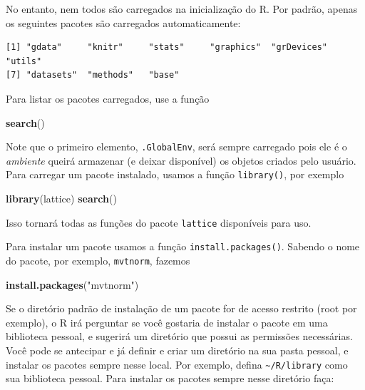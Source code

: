 \documentclass[10pt,a4paper]{book}
\newenvironment{Shaded}{\begin{snugshade}}{\end{snugshade}}
\newcommand{\KeywordTok}[1]{\textcolor[rgb]{0.13,0.29,0.53}{\textbf{#1}}}
\newcommand{\StringTok}[1]{\textcolor[rgb]{0.31,0.60,0.02}{#1}}
\newcommand{\NormalTok}[1]{#1}
\begin{document}
No entanto, nem todos são carregados na inicialização do R. Por padrão,
apenas os seguintes pacotes são carregados automaticamente:

\begin{verbatim}
[1] "gdata"     "knitr"     "stats"     "graphics"  "grDevices" "utils"    
[7] "datasets"  "methods"   "base"     
\end{verbatim}

Para listar os pacotes carregados, use a função

\begin{Shaded}
\begin{Highlighting}[]
\KeywordTok{search}\NormalTok{()}
\end{Highlighting}
\end{Shaded}

Note que o primeiro elemento, \texttt{.GlobalEnv}, será sempre carregado
pois ele é o \emph{ambiente} queirá armazenar (e deixar disponível) os
objetos criados pelo usuário. Para carregar um pacote instalado, usamos
a função \texttt{library()}, por exemplo

\begin{Shaded}
\begin{Highlighting}[]
\KeywordTok{library}\NormalTok{(lattice)}
\KeywordTok{search}\NormalTok{()}
\end{Highlighting}
\end{Shaded}

Isso tornará todas as funções do pacote \texttt{lattice} disponíveis
para uso.

Para instalar um pacote usamos a função \texttt{install.packages()}.
Sabendo o nome do pacote, por exemplo, \texttt{mvtnorm}, fazemos

\begin{Shaded}
\begin{Highlighting}[]
\KeywordTok{install.packages}\NormalTok{(}\StringTok{"mvtnorm"}\NormalTok{)}
\end{Highlighting}
\end{Shaded}

Se o diretório padrão de instalação de um pacote for de acesso restrito
(root por exemplo), o R irá perguntar se você gostaria de instalar o
pacote em uma biblioteca pessoal, e sugerirá um diretório que possui as
permissões necessárias. Você pode se antecipar e já definir e criar um
diretório na sua pasta pessoal, e instalar os pacotes sempre nesse
local. Por exemplo, defina \texttt{\textasciitilde{}/R/library} como sua
biblioteca pessoal. Para instalar os pacotes sempre nesse diretório
faça:
\end{document}
